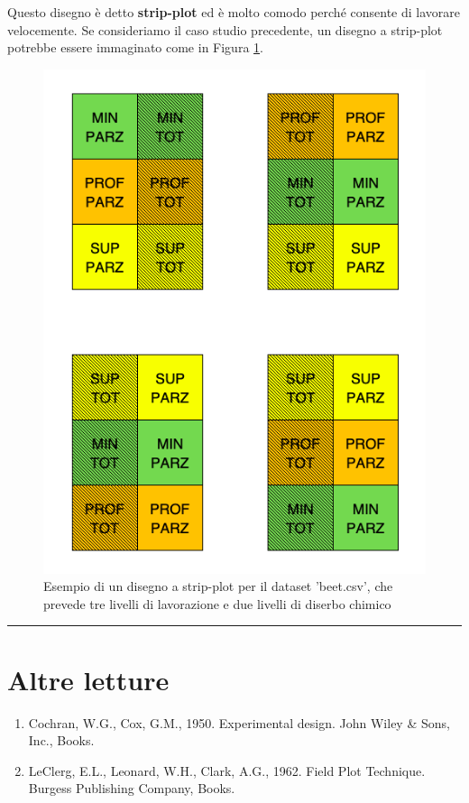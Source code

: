 \documentclass[a4paper,12pt,oneside]{book}
\providecommand{\tightlist}{%
  \setlength{\itemsep}{0pt}\setlength{\parskip}{0pt}}
\begin{document}
Questo disegno è detto \textbf{strip-plot} ed è molto comodo perché consente di lavorare velocemente. Se consideriamo il caso studio precedente, un disegno a strip-plot potrebbe essere immaginato come in Figura \ref{fig:figName253}.

\begin{figure}

{\centering \includegraphics[width=0.7\linewidth]{_images/Mappa3Strip} 

}

\caption{Esempio di un disegno a strip-plot per il dataset 'beet.csv', che prevede tre livelli di lavorazione e due livelli di diserbo chimico}\label{fig:figName253}
\end{figure}

\begin{center}\rule{0.5\linewidth}{0.5pt}\end{center}

\hypertarget{altre-letture-1}{%
\section{Altre letture}\label{altre-letture-1}}

\begin{enumerate}
\def\labelenumi{\arabic{enumi}.}
\tightlist
\item
  Cochran, W.G., Cox, G.M., 1950. Experimental design. John Wiley \& Sons, Inc., Books.
\item
  LeClerg, E.L., Leonard, W.H., Clark, A.G., 1962. Field Plot Technique. Burgess Publishing Company, Books.
\end{enumerate}
\end{document}
